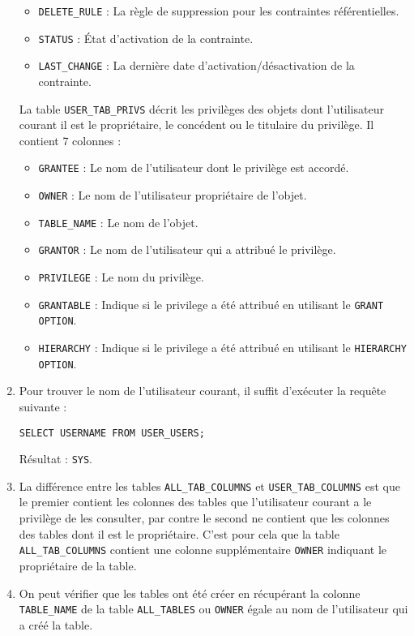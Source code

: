 \documentclass[12pt,a4paper]{article}
\begin{document}
\begin{enumerate}
\begin{itemize}
		\item \texttt{DELETE\_RULE} : La règle de suppression pour les contraintes référentielles.
		\item \texttt{STATUS} : \'{E}tat d'activation de la contrainte.
		\item \texttt{LAST\_CHANGE} : La dernière date d'activation/désactivation de la contrainte.
	\end{itemize}
	La table \texttt{USER\_TAB\_PRIVS} décrit les privilèges des objets dont l'utilisateur courant il est le propriétaire,
	le concédent ou le titulaire du privilège. Il contient 7 colonnes :
	\begin{itemize}
		\item \texttt{GRANTEE} : Le nom de l'utilisateur dont le privilège est accordé.
		\item \texttt{OWNER} : Le nom de l'utilisateur propriétaire de l'objet.
		\item \texttt{TABLE\_NAME} : Le nom de l'objet.
		\item \texttt{GRANTOR} : Le nom de l'utilisateur qui a attribué le privilège.
		\item \texttt{PRIVILEGE} : Le nom du privilège.
		\item \texttt{GRANTABLE} : Indique si le privilege a été attribué en utilisant le \texttt{GRANT OPTION}.
		\item \texttt{HIERARCHY} : Indique si le privilege a été attribué en utilisant le \texttt{HIERARCHY OPTION}.
	\end{itemize}
	\item Pour trouver le nom de l'utilisateur courant, il suffit d'exécuter la requête suivante :
	\begin{lstlisting}[style=OracleSQL]
		SELECT USERNAME FROM USER_USERS;
	\end{lstlisting}
	Résultat : \texttt{SYS}.
	\item La différence entre les tables \texttt{ALL\_TAB\_COLUMNS} et \texttt{USER\_TAB\_COLUMNS} est que le premier contient
	les colonnes des tables que l'utilisateur courant a le privilège de les consulter, par contre le second ne contient que les
	colonnes des tables dont il est le propriétaire. C'est pour cela que la table \texttt{ALL\_TAB\_COLUMNS} contient une colonne
	supplémentaire \texttt{OWNER} indiquant le propriétaire de la table.
	\item On peut vérifier que les tables ont été créer en récupérant la colonne \texttt{TABLE\_NAME} de la table \texttt{ALL\_TABLES}
	ou \texttt{OWNER} égale au nom de l'utilisateur qui a créé la table.

\end{enumerate}
\end{document}
